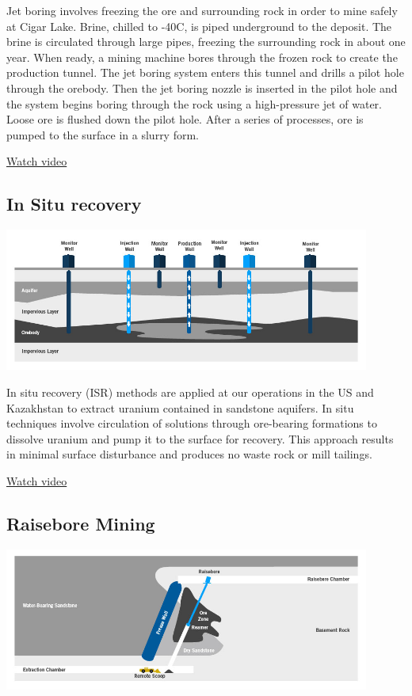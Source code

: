 Jet boring involves freezing the ore and surrounding rock in order to mine safely at Cigar Lake. Brine, chilled to -40C, is piped underground to the deposit. The brine is circulated through large pipes, freezing the surrounding rock in about one year. When ready, a mining machine bores through the frozen rock to create the production tunnel. The jet boring system enters this tunnel and drills a pilot hole through the orebody. Then the jet boring nozzle is inserted in the pilot hole and the system begins boring through the rock using a high-pressure jet of water. Loose ore is flushed down the pilot hole. After a series of processes, ore is pumped to the surface in a slurry form.

\href{https://www.cameco.com/businesses/mining-methods/jet-boring-video}{Watch video}
\subsection*{In Situ recovery}
\label{ssec:insitu}
\includegraphics[width=0.9\textwidth]{img/cameco/3.0.1-3MiningMethods-ISR.jpg}

In situ recovery (ISR) methods are applied at our operations in the US and Kazakhstan to extract uranium contained in sandstone aquifers. In situ techniques involve circulation of solutions through ore-bearing formations to dissolve uranium and pump it to the surface for recovery. This approach results in minimal surface disturbance and produces no waste rock or mill tailings.

\href{https://www.cameco.com/businesses/mining-methods/in-situ-recovery-video}{Watch video}
\subsection*{Raisebore Mining}
\label{ssec:raisebore}
\includegraphics[width=0.9\textwidth]{img/cameco/3.0.1-4MiningMethods-Raisebore.jpg}

